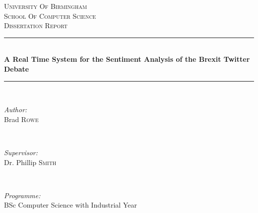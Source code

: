 \documentclass[11pt]{article}
\begin{document}
\begin{titlepage}

\newcommand{\HRule}{\rule{\linewidth}{0.5mm}} %

\center %
 

\textsc{
	\LARGE University Of Birmingham\\
	\vspace{5mm}
	\large School Of Computer Science
}\\[1.5cm] %
\textsc{\Large Dissertation Report}\\[0.5cm]


\HRule \\[0.4cm]
{ \huge \bfseries A Real Time System for the Sentiment Analysis of the Brexit Twitter
Debate}\\[0.4cm] %
\HRule \\[1.5cm]
 

\begin{minipage}{0.4\textwidth}
\begin{flushleft} \large
\emph{Author:}\\
Brad \textsc{Rowe} \\
\end{flushleft}
\end{minipage}
~
\begin{minipage}{0.4\textwidth}
\begin{flushright} \large
\emph{Supervisor:} \\
Dr. Phillip \textsc{Smith} %
\end{flushright}
\end{minipage}\\[0.5cm]

\begin{minipage}{1\textwidth}
\begin{center} \large
\emph{Programme:} \\
BSc Computer Science with Industrial Year 
\end{center}
\end{minipage}\\[0.5cm]



\end{titlepage}
\end{document}
